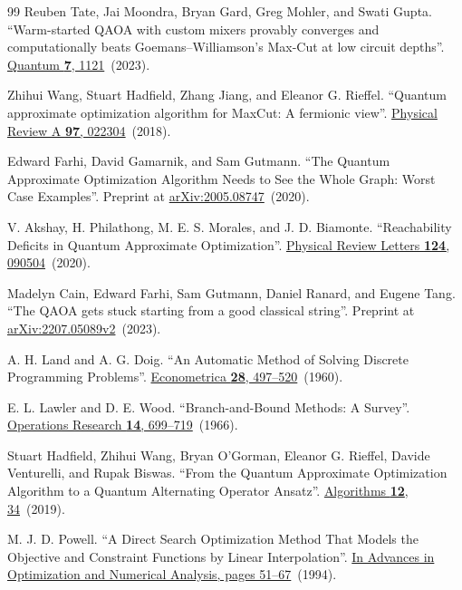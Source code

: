 \documentclass[a4paper,onecolumn,11pt,unpublished]{quantumarticle}
\theoremstyle{remark}
\begin{document}
\begin{thebibliography}{99}
Reuben Tate, Jai Moondra, Bryan Gard, Greg Mohler, and Swati Gupta.
\newblock ``Warm-started QAOA with custom mixers provably converges and computationally beats Goemans--Williamson's Max-Cut at low circuit depths''.
\newblock \href{https://dx.doi.org/10.22331/q-2023-09-26-1121}{Quantum {\bf 7}, 1121}~(2023).

Zhihui Wang, Stuart Hadfield, Zhang Jiang, and Eleanor G. Rieffel.
\newblock ``Quantum approximate optimization algorithm for MaxCut: A fermionic view''.
\newblock \href{https://doi.org/10.1103/physreva.97.022304}{Physical Review A {\bf 97}, 022304}~(2018).


Edward Farhi, David Gamarnik, and Sam Gutmann.
\newblock ``The Quantum Approximate Optimization Algorithm Needs to See the Whole Graph: Worst Case Examples''.
\newblock Preprint at \href{https://arxiv.org/abs/2005.08747}{arXiv:2005.08747}~(2020).


V. Akshay, H. Philathong, M. E. S. Morales, and J. D. Biamonte.
\newblock ``Reachability Deficits in Quantum Approximate Optimization''.
\newblock \href{https://doi.org/10.1103/physrevlett.124.090504}{Physical Review Letters {\bf 124}, 090504}~(2020).


Madelyn Cain, Edward Farhi, Sam Gutmann, Daniel Ranard, and Eugene Tang.
\newblock ``The QAOA gets stuck starting from a good classical string''.
\newblock Preprint at \href{https://arxiv.org/abs/2207.05089v2}{arXiv:2207.05089v2}~(2023).


A. H. Land and A. G. Doig.
\newblock ``An Automatic Method of Solving Discrete Programming Problems''.
\newblock \href{https://doi.org/10.2307/1910129}{Econometrica {\bf 28}, 497--520}~(1960).


E. L. Lawler and D. E. Wood.
\newblock ``Branch-and-Bound Methods: A Survey''.
\newblock \href{https://doi.org/10.1287/opre.14.4.699}{Operations Research {\bf 14}, 699--719}~(1966).


Stuart Hadfield, Zhihui Wang, Bryan O'Gorman, Eleanor G. Rieffel, Davide Venturelli, and Rupak Biswas.
\newblock ``From the Quantum Approximate Optimization Algorithm to a Quantum Alternating Operator Ansatz''.
\newblock \href{https://doi.org/10.3390/a12020034}{Algorithms {\bf 12}, 34}~(2019).


M. J. D. Powell.
\newblock ``A Direct Search Optimization Method That Models the Objective and Constraint Functions by Linear Interpolation''.
\newblock \href{https://doi.org/10.1007/978-94-015-8330-5_4}{In Advances in Optimization and Numerical Analysis, pages 51--67}~(1994).



\end{thebibliography}
\end{document}
